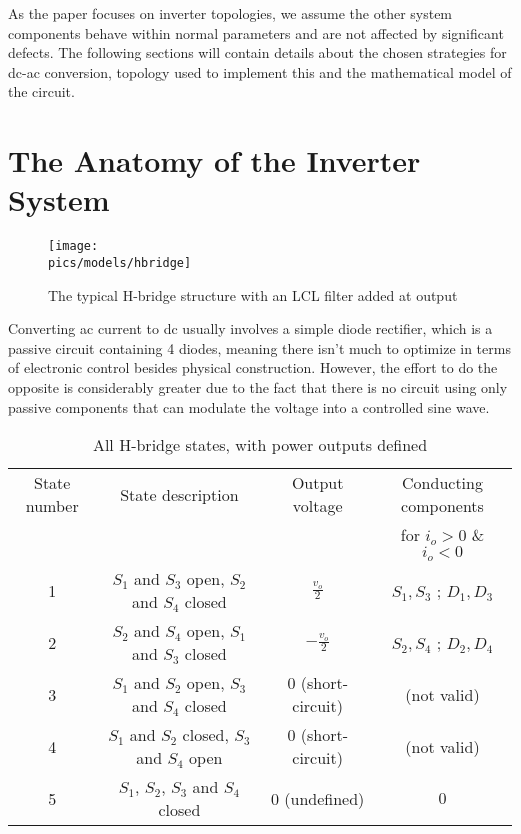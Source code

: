 As the paper focuses on inverter topologies, we assume the other system components behave within normal parameters and are not affected by significant defects.
The following sections will contain details about the chosen strategies for \gls{dc}-\gls{ac} conversion, topology used to implement this and the mathematical model of the circuit.

\section{The Anatomy of the Inverter System}
\label{sec:invsys}

\begin{figure}[!ht]
    \begin{center}\texttt{[image: \\pics/models/hbridge]}\end{center}
    \caption{The typical H-bridge structure with an LCL filter added at output}
    \label{fig:hbridge}
\end{figure}

Converting \gls{ac} current to \gls{dc} usually involves a simple diode rectifier, which is a passive circuit containing 4 diodes, meaning there isn't much to optimize in terms of electronic control besides physical construction.
However, the effort to do the opposite is considerably greater due to the fact that there is no circuit using only passive components that can modulate the voltage into a controlled sine wave.

\begin{table}[ht!]
\begin{tabular}{cccc}
\hline
State number & State description & Output voltage & Conducting components\\ 
 & & & for $i_o > 0$ \& $i_o < 0$ \\
\hline
1 & $S_1$ and $S_3$ open, $S_2$ and $S_4$ closed & $\frac{v_o}{2}$ & $S_1, S_3$ ; $D_1, D_3$\\
2 & $S_2$ and $S_4$ open, $S_1$ and $S_3$ closed & $-\frac{v_o}{2}$ & $S_2, S_4$ ; $D_2, D_4$\\
3 & $S_1$ and $S_2$ open, $S_3$ and $S_4$ closed & $0$ (short-circuit) & (not valid)\\
4 & $S_1$ and $S_2$ closed, $S_3$ and $S_4$ open & $0$ (short-circuit) & (not valid)\\
5 & $S_1$, $S_2$, $S_3$ and $S_4$ closed & $0$ (undefined) & $0$\\
\hline
\end{tabular}
\centering
\caption{All H-bridge states, with power outputs defined}
\label{tab:switchfunc}
\end{table}

